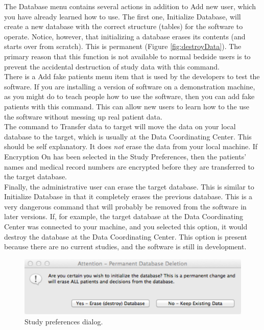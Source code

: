 The Database menu contains several actions in addition to Add new user, which you have already learned how to use.  The first one,
Initialize Database, will create a new database with the correct structure (tables) for the software to operate.  Notice, however, 
that initializing a database erases its contents (and starts over from scratch).  This is permanent (Figure \vref{fig:destroyData}).
The primary reason that this function is not available to normal bedside users is to prevent the accidental destruction
of study data with this command.\\

There is a Add fake patients menu item that is used by the developers to test the software.  If you are installing a version
of software on a demonstration machine, as you might do to teach people how to use the software, then you can add fake patients
with this command.  This can allow new users to learn how to the use the software without messing up real patient data.\\

The command to Transfer data to target will move the data on your local database to the target, which is usually
at the Data Coordinating Center.  This should be self explanatory.  It does \emph{not} erase the data from your local
machine.  If Encryption On has been selected in the Study Preferences, then the patients' names and medical record numbers are encrypted
before they are transferred to the target database.\\

Finally, the administrative user can erase the target database.  This is similar to Initialize Database in that it completely
erases the previous database.  This is a very dangerous command that will probably be removed from the software in later
versions.  If, for example, the target database at the Data Coordinating Center was connected to your machine, and you selected this
option, it would destroy the database at the Data Coordinating Center.  This option is present because there are no
current studies, and the software is still in development.

\begin{figure}[htbp] 
   \centering
   \includegraphics[width=\textwidth]{DatabaseDestroyAlert} 
   \caption{Study preferences dialog.}
   \label{fig:destroyData}
\end{figure}


